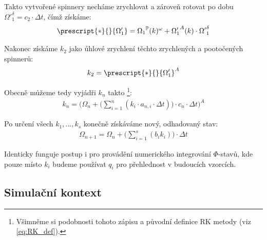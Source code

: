 \clearpage

Takto vytvořené spinnery necháme zrychlovat a zároveň rotovat po dobu ${\Omega'}_1^\delta = c_2 \cdot \Delta t$, čímž získáme:
\begin{equation}
    \label{eq:sim_equations_formalized9}
    \begin{gathered}
        \prescript{*}{}{\Omega_1'} = {\Omega_1}^{\mathbb{P}} (k) ^{\omega} + {\Omega_1'}^{A} (k) \cdot {\Omega'}_1^\delta
    \end{gathered}
\end{equation}

Nakonec získáme $k_2$ jako úhlové zrychlení těchto zrychlených a pootočených spinnerů:
\begin{equation}
    \label{eq:sim_equations_formalized10}
    \begin{gathered}
        k_2 = \prescript{*}{}{\Omega_1'}^{A}
    \end{gathered}
\end{equation}

Obecně můžeme tedy vyjádři $k_{n}$ takto \footnote{Všimněme si podobnosti tohoto zápisu a původní definice RK metody (viz \autoref{eq:RK_def}).}:
\begin{equation}
    \label{eq:sim_equations_formalized11}
    \begin{gathered}
        k_{n} = \Bigg( {\Omega_n} + \Bigg( \sum_{i=1}^{n} ( k_i \cdot a_{n, i} \cdot \Delta t) \Bigg) \cdot c_{n} \cdot \Delta t \Bigg)^A
    \end{gathered}
\end{equation}

Po určení všech $k_1, \ldots, k_s$ konečně získáváme nový, odhadovaný stav:
\begin{equation}
    \label{eq:sim_equations_formalized12}
    \begin{gathered}
        {\Omega_{n+1}} = \Omega_{n} + \Bigg(\sum_{i=1}^{s} ( b_i k_i)\Bigg) \cdot \Delta t
    \end{gathered}
\end{equation}

Identicky funguje postup i pro provádění numerického integrování $\Phi$-stavů, kde pouze místo $k_i$ budeme používat $q_i$ pro přehlednost v budoucích vzorcích.

\subsection{Simulační kontext}

